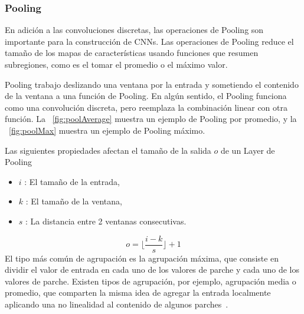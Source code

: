 \subsubsection{Pooling }
En adición a las convoluciones discretas, las operaciones de \gls{Pooling} son importante para la construcción de \gls{CNN}s. Las operaciones de \gls{Pooling} reduce el tamaño de los mapas de características usando funciones que resumen subregiones, como es el tomar el promedio o el máximo valor. 

\gls{Pooling} trabajo deslizando una ventana por la entrada y sometiendo el contenido de la ventana a una función de \gls{Pooling}. En algún sentido, el \gls{Pooling} funciona como una convolución discreta, pero reemplaza la combinación linear con otra función. La \figurename~\ref{fig:poolAverage} muestra un ejemplo de \gls{Pooling} por promedio, y la \figurename~\ref{fig:poolMax} muestra un ejemplo de \gls{Pooling} máximo.

Las siguientes propiedades afectan el tamaño de la salida $o$ de un \gls{Layer} de \gls{Pooling} 
\begin{itemize}
    \item $i$ : El tamaño de la entrada,
    \item $k$ : El tamaño de la ventana,
    \item $s$ : La distancia entre 2 ventanas consecutivas.
 
\end{itemize}
\begin{equation}
    o = \lfloor\frac{i-k}{s}\rfloor+1
\end{equation}
El tipo más común de agrupación es la agrupación máxima, que consiste en dividir el valor de entrada en cada uno de los valores de parche y cada uno de los valores de parche. Existen tipos de agrupación, por ejemplo, agrupación media o promedio, que comparten la misma idea de agregar la entrada localmente aplicando una no linealidad al contenido de algunos parches~\cite{boureau2010learning}.


